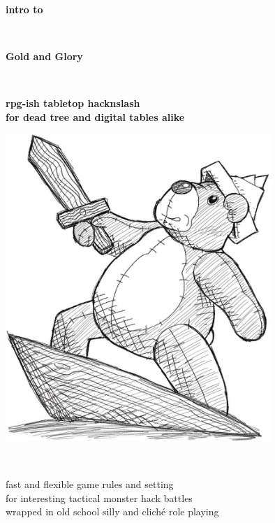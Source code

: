 \begin{titlepage}
\thispagestyle{empty}

\begin{center}

   \vspace{40mm}

   \textbf{\Large{intro to}}

   \

   \textbf{\Huge{Gold and Glory}}

   \

   \textbf{\Large{rpg-ish tabletop hacknslash\\
             for dead tree and digital tables alike}}\\


   \vspace{20mm}

   \includegraphics[width=100mm]{./figs/teddyhero.jpg}

   \vspace{20mm} %

   \

   \large{
       fast and flexible game rules and setting\\
       for interesting tactical monster hack battles\\
       wrapped in old school silly and cliché role playing
   }



   \vfill %


\end{center}
\end{titlepage}
